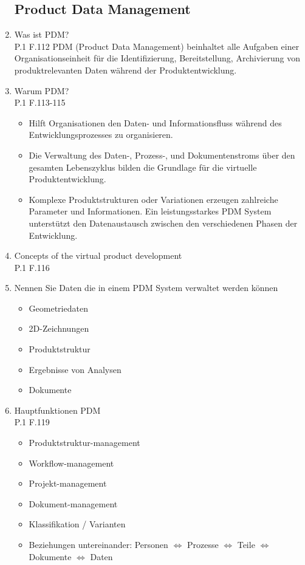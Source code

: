 \documentclass[10pt,a4paper,fleqn]{article}
\begin{document}
\begin{enumerate}
\subsection{Product Data Management}
	\item Was ist PDM?\\
		P.1 F.112
		PDM (Product Data Management) beinhaltet alle Aufgaben einer Organisationseinheit für die Identifizierung, Bereitstellung, Archivierung von produktrelevanten Daten während der Produktentwicklung.
	\item Warum PDM?\\
		P.1 F.113-115
		\begin{itemize}
			\item Hilft Organisationen den Daten- und Informationsfluss während des Entwicklungsprozesses zu organisieren.
			\item Die Verwaltung des Daten-, Prozess-, und Dokumentenstroms über den gesamten Lebenszyklus bilden die Grundlage für die virtuelle Produktentwicklung.
			\item Komplexe Produktstrukturen oder Variationen erzeugen zahlreiche Parameter und Informationen. Ein leistungsstarkes PDM System unterstützt den Datenaustausch zwischen den verschiedenen Phasen der Entwicklung.
		\end{itemize}
	\item Concepts of the virtual product development\\
		P.1 F.116
\pagebreak
	\item Nennen Sie Daten die in einem PDM System verwaltet werden können
		\begin{itemize}
			\item Geometriedaten
			\item 2D-Zeichnungen
			\item Produktstruktur
			\item Ergebnisse von Analysen
			\item Dokumente
		\end{itemize}
	\item Hauptfunktionen PDM\\
		P.1 F.119
		\begin{itemize}
			\item Produktstruktur-management
			\item Workflow-management
			\item Projekt-management
			\item Dokument-management
			\item Klassifikation / Varianten
			\item Beziehungen untereinander: Personen $\Leftrightarrow$ Prozesse $\Leftrightarrow$ Teile $\Leftrightarrow$ Dokumente $\Leftrightarrow$ Daten
		\end{itemize}
\newpage

\end{enumerate}
\end{document}
